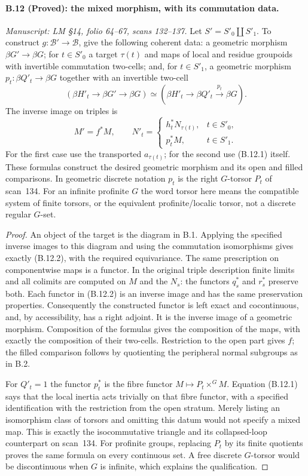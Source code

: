 \paragraph{B.12 (Proved): the mixed morphism, with its commutation data.}\label{B12}
\textit{Manuscript: LM \S14, folio 64--67, scans 132--137.}
Let $S'=S'_0\amalg S'_1$. To construct
$g:\mathcal B'\to\mathcal B$, give the following coherent
data: a geometric morphism $\beta G'\to\beta G$;
for $t\in S'_0$ a target $\tau(t)$ and maps of local and
residue groupoids with invertible commutation two-cells;
and, for $t\in S'_1$, a geometric morphism
$p_t:\beta Q'_t\to\beta G$ together with an invertible
two-cell
\[
 (\beta H'_t\to\beta G'\to\beta G)
       \simeq(\beta H'_t\to\beta Q'_t\xrightarrow{p_t}\beta G).
                                                               \tag{B.12.1}
\]
The inverse image on triples is
\[
 M'=f^*M,\qquad
 N'_t=\begin{cases}
        h_t^*N_{\tau(t)},&t\in S'_0,\\
        p_t^*M,&t\in S'_1.
       \end{cases}                                           \tag{B.12.2}
\]
For the first case use the transported $a_{\tau(t)}$;
for the second use (B.12.1) itself. These formulas
construct the desired geometric morphism and its open
and filled comparisons. In geometric discrete notation
$p_t$ is the right $G$-torsor $P_t$ of scan~134.
For an infinite profinite $G$ the word torsor here means
the compatible system of finite torsors, or the
equivalent profinite/localic torsor, not a discrete
regular $G$-set.

\begin{proof}
An object of the target is the diagram in B.1. Applying
the specified inverse images to this diagram and using
the commutation isomorphisms gives exactly (B.12.2), with
the required equivariance. The same prescription on
componentwise maps is a functor. In the original triple
description finite limits and all colimits are computed
on $M$ and the $N_s$: the functors $q_s^*$ and $r_s^*$
preserve both. Each functor in (B.12.2) is an inverse
image and has the same preservation properties.
Consequently the constructed functor is left exact and
cocontinuous, and, by accessibility, has a right adjoint.
It is the inverse image of a geometric morphism.
Composition of the formulas gives the composition of
the maps, with exactly the composition of their
two-cells. Restriction to the open part gives $f$;
the filled comparison follows by quotienting the
peripheral normal subgroups as in B.2.

For $Q'_t=1$ the functor $p_t^*$ is the fibre functor
$M\mapsto P_t\times^G M$. Equation (B.12.1) says that
the local inertia acts trivially on that fibre functor,
with a specified identification with the restriction
from the open stratum. Merely listing an isomorphism
class of torsors and omitting this datum would not
specify a mixed map. This is exactly the isocommutative
triangle and its collapsed-loop counterpart on scan~134.
For profinite groups, replacing $P_t$ by its finite
quotients proves the same formula on every continuous
set. A free discrete $G$-torsor would be discontinuous
when $G$ is infinite, which explains the qualification.
\end{proof}

